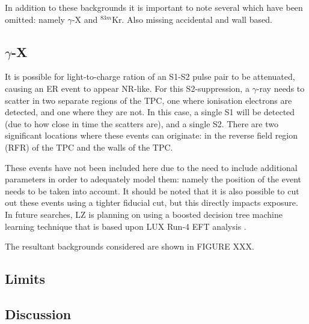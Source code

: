 \par
In addition to these backgrounds it is important to note several which have been omitted: namely $\gamma$-X and ${}^{83m}$Kr.
Also missing accidental and wall based.

\subsection{$\gamma$-X}
It is possible for light-to-charge ration of an S1-S2 pulse pair to be attenuated, causing an ER event to appear NR-like.
For this S2-suppression, a $\gamma$-ray needs to scatter in two separate regions of the TPC, one where ionisation electrons are detected, and one where they are not.
In this case, a single S1 will be detected (due to how close in time the scatters are), and a single S2.
There are two significant locations where these events can originate: in the reverse field region (RFR) of the TPC and the walls of the TPC.
\par
These events have not been included here due to the need to include additional parameters in order to adequately model them: namely the position of the event needs to be taken into account.
It should be noted that it is also possible to cut out these events using a tighter fiducial cut, but this directly impacts exposure.
In future searches, LZ is planning on using a boosted decision tree machine learning technique that is based upon LUX Run-4 EFT analysis \cite{LUX_RUN4_EFT_2021}.

\par
The resultant backgrounds considered are shown in FIGURE XXX.



\subsection{Limits}
\par


\subsection{Discussion}